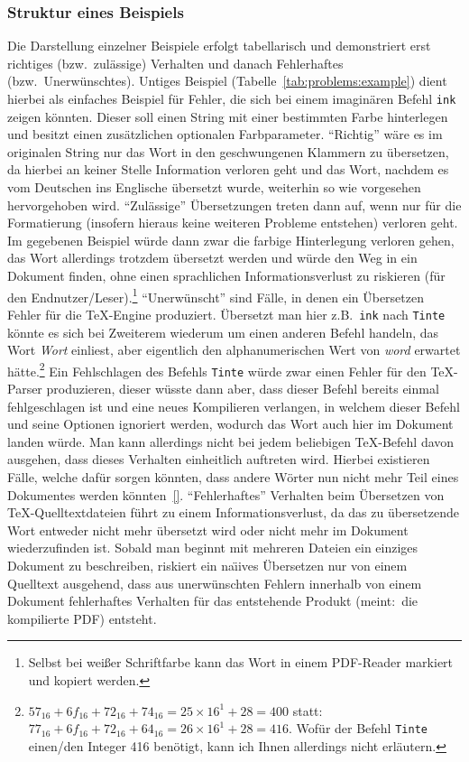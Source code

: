 \subsubsection*{Struktur eines Beispiels}
Die Darstellung einzelner Beispiele erfolgt tabellarisch und demonstriert erst richtiges (bzw.\ zulässige) Verhalten und danach Fehlerhaftes (bzw.\ Unerwünschtes). Untiges Beispiel (Tabelle~\ref{tab:problems:example}) dient hierbei als einfaches Beispiel für Fehler, die sich bei einem imaginären Befehl \texttt{ink} zeigen könnten. Dieser soll einen String mit einer bestimmten Farbe hinterlegen und besitzt einen zusätzlichen optionalen Farbparameter. 
\enquote{Richtig} wäre es im originalen String nur das Wort in den geschwungenen Klammern zu übersetzen, da hierbei an keiner Stelle Information verloren geht und das Wort, nachdem es vom Deutschen ins Englische übersetzt wurde, weiterhin so wie vorgesehen hervorgehoben wird.
\enquote{Zulässige} Übersetzungen treten dann auf, wenn nur für die Formatierung (insofern hieraus keine weiteren Probleme entstehen) verloren geht. Im gegebenen Beispiel würde dann zwar die farbige Hinterlegung verloren gehen, das Wort allerdings trotzdem übersetzt werden und würde den Weg in ein Dokument finden, ohne einen sprachlichen Informationsverlust zu riskieren (für den Endnutzer/Leser).\footnote{Selbst bei weißer Schriftfarbe kann das Wort in einem PDF-Reader markiert und kopiert werden.}
\enquote{Unerwünscht} sind Fälle, in denen ein Übersetzen Fehler für die \TeX{}-Engine produziert. Übersetzt man hier z.B.\ \texttt{ink} nach \texttt{Tinte} könnte es sich bei Zweiterem wiederum um einen anderen Befehl handeln, das Wort \textit{Wort} einliest, aber eigentlich den alphanumerischen Wert von \textit{word} erwartet hätte.\footnote{$57_{16}+6f_{16} + 72_{16} + 74_{16} = 25\times 16^1 + 28 = 400$ statt:\ $77_{16}+6f_{16} + 72_{16} + 64_{16} = 26\times 16^1 + 28 = 416$. Wofür der Befehl \texttt{Tinte} einen/den Integer 416 benötigt, kann ich Ihnen allerdings nicht erläutern.} Ein Fehlschlagen des Befehls \texttt{Tinte} würde zwar einen Fehler für den \TeX{}-Parser produzieren, dieser wüsste dann aber, dass dieser Befehl bereits einmal fehlgeschlagen ist und eine neues Kompilieren verlangen, in welchem dieser Befehl und seine Optionen ignoriert werden, wodurch das Wort auch hier im Dokument landen würde. Man kann allerdings nicht bei jedem beliebigen \TeX{}-Befehl davon ausgehen, dass dieses Verhalten einheitlich auftreten wird. Hierbei existieren Fälle, welche dafür sorgen könnten, dass andere Wörter nun nicht mehr Teil eines Dokumentes werden könnten~\ref{}.%
\enquote{Fehlerhaftes} Verhalten beim Übersetzen von \TeX{}-Quelltextdateien führt zu einem Informationsverlust, da das zu übersetzende Wort entweder nicht mehr übersetzt wird oder nicht mehr im Dokument wiederzufinden ist. Sobald man beginnt mit mehreren Dateien ein einziges Dokument zu beschreiben, riskiert ein na\"\i ives Übersetzen nur von einem Quelltext ausgehend, dass aus unerwünschten Fehlern innerhalb von einem Dokument fehlerhaftes Verhalten für das entstehende Produkt (meint:\ die kompilierte PDF) entsteht. 

